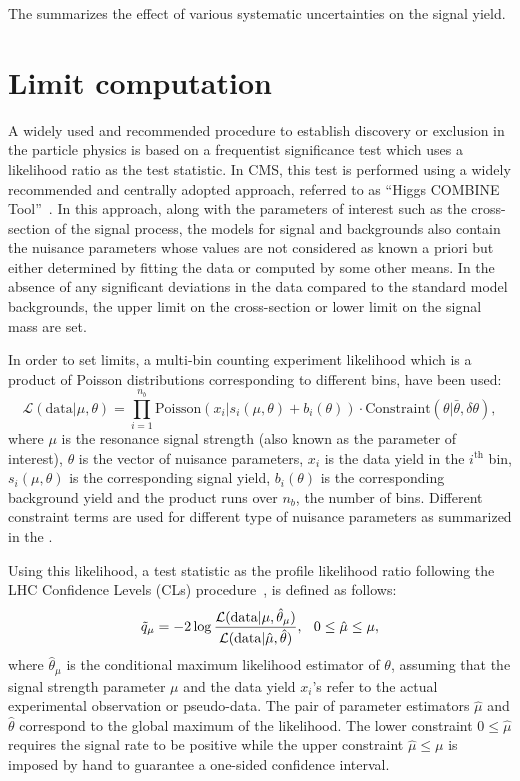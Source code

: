 The \tab{\ref{Table:SysUnc}} summarizes the effect of various systematic uncertainties on the signal yield.


\section{Limit computation}\label{Se:Limits}
A widely used and recommended procedure to establish discovery or exclusion in the particle physics is based on a frequentist significance test 
which uses a likelihood ratio as the test statistic. In CMS, this test is performed using a widely recommended and centrally adopted approach, referred to as
``Higgs COMBINE Tool''~\cite{Web:HiggsComb}. In this approach, along with the parameters of interest such as the cross-section of 
the signal process, the models for signal and backgrounds also contain the nuisance parameters whose values are not considered
as known a priori but either determined by fitting the data or computed by some other means. In the absence of any significant deviations in the data
compared to the standard model backgrounds, the upper limit on the cross-section or lower limit on the signal mass are set. 

In order to set limits, a multi-bin counting experiment likelihood which is a product of Poisson
distributions corresponding to different bins, have been used:
\begin{equation}
\mathcal{L}(\textrm{data}|\mu,\theta) = \prod_{i=1}^{n_{b}}\textrm{Poisson}(x_{i}|s_{i}(\mu,\theta) + b_{i}(\theta)) \cdot \textrm{Constraint}(\theta|\bar{\theta}, \delta\theta),
\end{equation}
where $\mu$ is the resonance signal strength (also known as the parameter of interest), $\theta$ is the vector of nuisance parameters, $x_{i}$ is the data yield in the 
$i^{\textrm{th}}$ bin, $s_{i}(\mu,\theta)$ is the corresponding signal yield, $b_{i}(\theta)$ is the corresponding background yield and  
the product runs over $n_{b}$, the number of bins. Different constraint terms are used for different type of nuisance parameters as summarized in 
the \tab{\ref{Table:SystConstraint}}.


Using this likelihood, a test statistic as the profile likelihood ratio following the LHC Confidence Levels (CLs) procedure~\cite{CMS-NOTE-2011-005}, is defined as follows:
\begin{equation}
\tilde{q}_{\mu} = -2 \log \frac{\mathcal{L}(\textrm{data}|\mu,\hat{\theta}_{\mu})}{\mathcal{L}(\textrm{data}|\hat{\mu},\hat{\theta})}, \hspace{0.1in} 0 \leq \hat{\mu} \leq \mu,
\end{equation}
where $\hat{\theta}_{\mu}$ is the conditional maximum likelihood estimator of $\theta$, assuming that the signal strength parameter $\mu$ and 
the data yield $x_{i}$'s refer to the actual experimental observation or pseudo-data. The pair of parameter estimators $\hat{\mu}$ and $\hat{\theta}$
correspond to the global maximum of the likelihood. The lower constraint $0 \leq \hat{\mu}$ requires the signal rate to be positive while
the upper constraint $\hat{\mu} \leq \mu$ is imposed by hand to guarantee a one-sided confidence interval.

